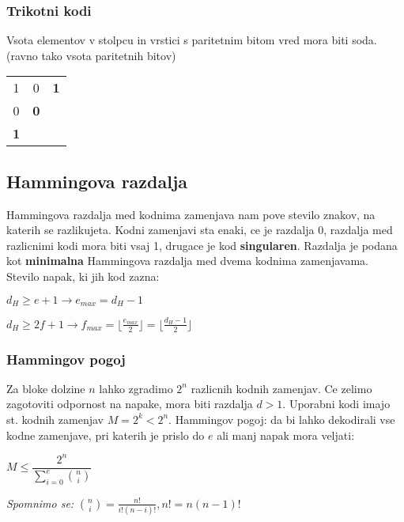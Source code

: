 \documentclass{article}
\begin{document}
\begin{multicols}{2}
	\subsubsection{Trikotni kodi}
	Vsota elementov v stolpcu in vrstici s paritetnim bitom vred mora biti soda. (ravno tako vsota paritetnih bitov)
	\begin{center}
		\begin{tabular}{ ccc }
			1          & 0          & \textbf{1} \\
			0          & \textbf{0} &            \\
			\textbf{1} &            &            \\
		\end{tabular}
	\end{center}

	\subsection{Hammingova razdalja}
	Hammingova razdalja med kodnima zamenjava nam pove stevilo znakov, na katerih se razlikujeta. Kodni zamenjavi sta enaki,
	ce je razdalja 0, razdalja med razlicnimi kodi mora biti vsaj 1, drugace je kod \textbf{singularen}.
	Razdalja je podana kot \textbf{minimalna} Hammingova razdalja med dvema kodnima zamenjavama.
	Stevilo napak, ki jih kod zazna:
	\begin{center}
		$d_H \geq e + 1 \rightarrow e_{max} = d_H-1$
	\end{center}
	\begin{center}
		$d_H \geq 2f + 1 \rightarrow f_{max} = \lfloor \frac{e_{max}}{2} \rfloor = \lfloor \frac{d_H-1}{2} \rfloor$
	\end{center}

	\subsubsection{Hammingov pogoj}
	Za bloke dolzine $n$ lahko zgradimo $2^n$ razlicnih kodnih zamenjav. Ce zelimo zagotoviti odpornost na napake,
	mora biti razdalja $d > 1$. Uporabni kodi imajo st. kodnih zamenjav $M = 2^k < 2^n$.
	Hammingov pogoj: da bi lahko dekodirali vse kodne zamenjave, pri katerih je prislo do $e$ ali manj napak
	mora veljati:
	\begin{center}
		\begin{math}
			M \leq \dfrac{2^n}{\sum_{i=0}^e{n \choose i}}
		\end{math}
	\end{center}
	\textit{Spomnimo se:}
	\begin{math}
		{n \choose i} = \frac{n!} {i! (n - i)!}, n! = n(n -1)!
	\end{math}


\end{multicols}
\end{document}
